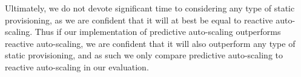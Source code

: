 Ultimately, we do not devote significant time to
considering any type of static provisioning, as we are confident that it will at
best be equal to reactive auto-scaling. Thus if our implementation of predictive
auto-scaling outperforms reactive auto-scaling, we are confident that it will
also outperform any type of static provisioning, and as such we only compare
predictive auto-scaling to reactive auto-scaling in our evaluation.
